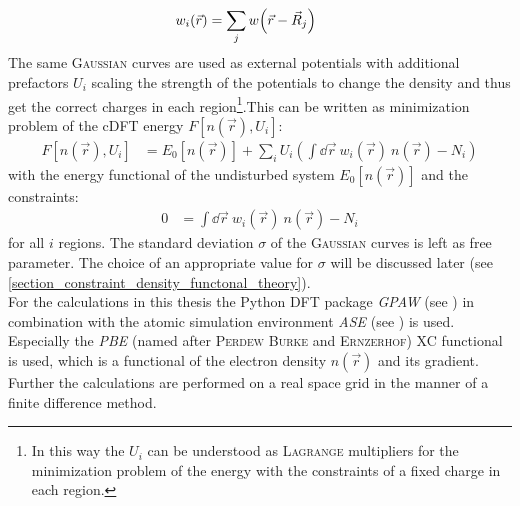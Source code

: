 \begin{align}
w_i\left(\vec{r}\right) &= \sum_j w\left(\vec{r} - \vec{R}_j\right) \text{\quad}
\end{align}
The same \textsc{Gaussian} curves are used as external potentials with additional prefactors $U_i$ scaling the strength of the potentials to change the density and thus get the correct charges in each region\footnote{In this way the $U_i$ can be understood as \textsc{Lagrange} multipliers for the minimization problem of the energy with the constraints of a fixed charge in each region.}.This can be written as minimization problem of the cDFT energy $F[n\left(\vec{r}\right), U_i]$:
\begin{align}
F\left[n\left(\vec{r}\right), U_i\right] &= E_0\left[n\left(\vec{r}\right)\right] + \sum_i U_i\left(\int\dd\vec{r}\ w_i\left(\vec{r}\right)\ n\left(\vec{r}\right) - N_i\right)
\end{align}
with the energy functional of the undisturbed system $E_0\left[n\left(\vec{r}\right)\right]$ and the constraints:
\begin{align}
0 &= \int\dd\vec{r}\ w_i\left(\vec{r}\right)\ n\left(\vec{r}\right) - N_i
\end{align}
for all $i$ regions. The standard deviation $\sigma$ of the \textsc{Gaussian} curves is left as free parameter. The choice of an appropriate value for $\sigma$ will be discussed later (see \cref{section_constraint_density_functonal_theory}).\\
For the calculations in this thesis the Python DFT package \emph{GPAW} (see \cite{GPAW1, GPAW2}) in combination with the atomic simulation environment \emph{ASE} (see \cite{ASE}) is used. Especially the \emph{PBE} (named after \textsc{Perdew Burke} and \mbox{\textsc{Ernzerhof}}) XC functional is used, which is a functional of the electron density $n\left(\vec{r}\right)$  and its gradient. Further the calculations are performed on a real space grid in the manner of a finite difference method.
